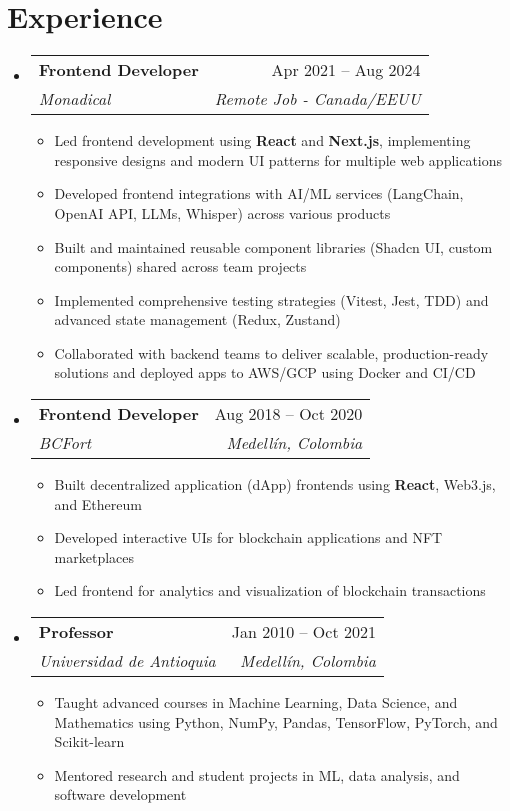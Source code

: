 \documentclass[letterpaper,11pt]{article}
\makeatletter
\newcommand{\resumeSubheading}[4]{
  \vspace{-2pt}
  \item[]
  \begin{tabular*}{\textwidth}{@{\extracolsep{\fill}}l r}
    \textbf{#1} & #2 \\
    \textit{#3} & \textit{#4} \\
  \end{tabular*}
  \vspace{-5pt}
}
\makeatother
\begin{document}
\section{Experience}
\begin{itemize}[leftmargin=0pt, itemindent=0pt, label={}]
\resumeSubheading
{Frontend Developer}{Apr 2021 -- Aug 2024}
{Monadical}{Remote Job - Canada/EEUU}
\begin{itemize}[leftmargin=*]
\item Led frontend development using \textbf{React} and \textbf{Next.js}, implementing responsive designs and modern UI patterns for multiple web applications
\item Developed frontend integrations with AI/ML services (LangChain, OpenAI API, LLMs, Whisper) across various products
\item Built and maintained reusable component libraries (Shadcn UI, custom components) shared across team projects
\item Implemented comprehensive testing strategies (Vitest, Jest, TDD) and advanced state management (Redux, Zustand)
\item Collaborated with backend teams to deliver scalable, production-ready solutions and deployed apps to AWS/GCP using Docker and CI/CD
\end{itemize}

\resumeSubheading
{Frontend Developer}{Aug 2018 -- Oct 2020}
{BCFort}{Medellín, Colombia}
\begin{itemize}[leftmargin=*]
    \item Built decentralized application (dApp) frontends using \textbf{React}, Web3.js, and Ethereum
    \item Developed interactive UIs for blockchain applications and NFT marketplaces
    \item Led frontend for analytics and visualization of blockchain transactions
\end{itemize}

\resumeSubheading
{Professor}{Jan 2010 -- Oct 2021}
{Universidad de Antioquia}{Medellín, Colombia}
\begin{itemize}[leftmargin=*]
    \item Taught advanced courses in Machine Learning, Data Science, and Mathematics using Python, NumPy, Pandas, TensorFlow, PyTorch, and Scikit-learn
    \item Mentored research and student projects in ML, data analysis, and software development
\end{itemize}


\end{itemize}
\end{document}
